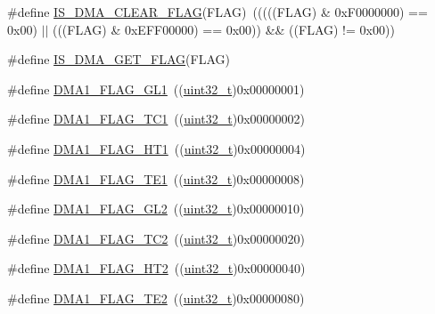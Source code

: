 \begin{DoxyCompactItemize}
\item 
\#define \hyperlink{group___d_m_a__flags__definition_ga4b33e418489c9a3c9adcbdbaca93e4a3}{I\+S\+\_\+\+D\+M\+A\+\_\+\+C\+L\+E\+A\+R\+\_\+\+F\+L\+AG}(F\+L\+AG)~(((((F\+L\+AG) \& 0x\+F0000000) == 0x00) $\vert$$\vert$ (((\+F\+L\+A\+G) \& 0x\+E\+F\+F00000) == 0x00)) \&\& ((\+F\+L\+A\+G) != 0x00))
\item 
\#define \hyperlink{group___d_m_a__flags__definition_ga98e421aa0a15fbeecb4cab3612985676}{I\+S\+\_\+\+D\+M\+A\+\_\+\+G\+E\+T\+\_\+\+F\+L\+AG}(F\+L\+AG)
\item 
\#define \hyperlink{group___d_m_a__flags__definition_gad1ac00f031065682ac125f6f9be061e6}{D\+M\+A1\+\_\+\+F\+L\+A\+G\+\_\+\+G\+L1}~((\hyperlink{_p_e___types_8h_a33594304e786b158f3fb30289278f5af}{uint32\+\_\+t})0x00000001)
\item 
\#define \hyperlink{group___d_m_a__flags__definition_gaa9b4d1112bcfd34136007b813a11187e}{D\+M\+A1\+\_\+\+F\+L\+A\+G\+\_\+\+T\+C1}~((\hyperlink{_p_e___types_8h_a33594304e786b158f3fb30289278f5af}{uint32\+\_\+t})0x00000002)
\item 
\#define \hyperlink{group___d_m_a__flags__definition_ga9c806b96cfdcebddb64f70d13ad32270}{D\+M\+A1\+\_\+\+F\+L\+A\+G\+\_\+\+H\+T1}~((\hyperlink{_p_e___types_8h_a33594304e786b158f3fb30289278f5af}{uint32\+\_\+t})0x00000004)
\item 
\#define \hyperlink{group___d_m_a__flags__definition_gae30157801ac1460dab86a8f54cfd3479}{D\+M\+A1\+\_\+\+F\+L\+A\+G\+\_\+\+T\+E1}~((\hyperlink{_p_e___types_8h_a33594304e786b158f3fb30289278f5af}{uint32\+\_\+t})0x00000008)
\item 
\#define \hyperlink{group___d_m_a__flags__definition_gad27b8a0cf554638d78fb67a010c0419b}{D\+M\+A1\+\_\+\+F\+L\+A\+G\+\_\+\+G\+L2}~((\hyperlink{_p_e___types_8h_a33594304e786b158f3fb30289278f5af}{uint32\+\_\+t})0x00000010)
\item 
\#define \hyperlink{group___d_m_a__flags__definition_ga0eff24f7e6b2b874328d531ee9315b20}{D\+M\+A1\+\_\+\+F\+L\+A\+G\+\_\+\+T\+C2}~((\hyperlink{_p_e___types_8h_a33594304e786b158f3fb30289278f5af}{uint32\+\_\+t})0x00000020)
\item 
\#define \hyperlink{group___d_m_a__flags__definition_gae154ffd90ebaec11f9ed1be00e69f149}{D\+M\+A1\+\_\+\+F\+L\+A\+G\+\_\+\+H\+T2}~((\hyperlink{_p_e___types_8h_a33594304e786b158f3fb30289278f5af}{uint32\+\_\+t})0x00000040)
\item 
\#define \hyperlink{group___d_m_a__flags__definition_ga23bfb917d32a8dd5a96d343ef5f6ea46}{D\+M\+A1\+\_\+\+F\+L\+A\+G\+\_\+\+T\+E2}~((\hyperlink{_p_e___types_8h_a33594304e786b158f3fb30289278f5af}{uint32\+\_\+t})0x00000080)
$$
\end{DoxyCompactItemize}
